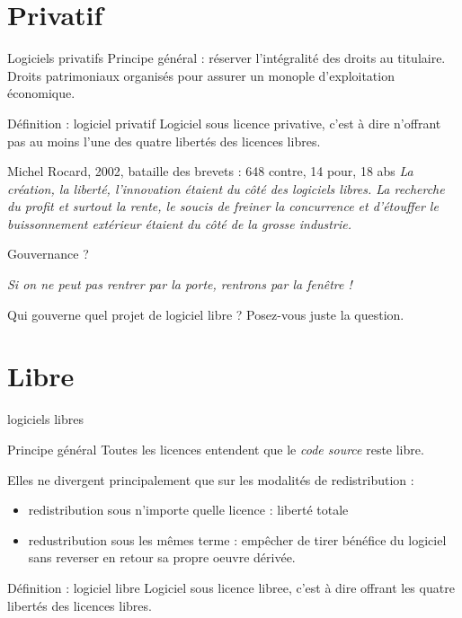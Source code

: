 \documentclass{beamer}
\begin{document}
\section{Privatif}


\begin{frame}{Logiciels privatifs}
  Principe général : réserver l'intégralité des droits au titulaire. Droits patrimoniaux organisés pour assurer un monople d'exploitation économique.

  \begin{alertblock}{Définition : logiciel privatif}
    Logiciel sous licence privative, c'est à dire n'offrant pas au moins l'une des quatre libertés des licences libres.    
  \end{alertblock}

\pause

  \begin{block}{Michel Rocard, 2002, bataille des brevets : 648 contre, 14 pour, 18 abs}
   \textit{ La création, la liberté, l'innovation étaient du côté des logiciels libres. La recherche du profit et surtout la rente, le soucis de freiner la concurrence et d'étouffer le buissonnement extérieur étaient du côté de la grosse industrie.
}
  \end{block}
\end{frame}

\begin{frame}{Gouvernance ?}
  
\textit{Si on ne peut pas rentrer par la porte, rentrons par la fenêtre !}

Qui gouverne quel projet de logiciel libre ? Posez-vous juste la question.

\end{frame}

\section{Libre}


\begin{frame}{logiciels libres}

  \begin{alertblock}{Principe général}
    Toutes les licences entendent que le \textit{code source} reste libre.
  \end{alertblock}
  Elles ne divergent principalement que sur les modalités de redistribution :
  \begin{itemize}
  \item redistribution sous n'importe quelle licence : liberté totale
  \item redustribution sous les mêmes terme : empêcher de tirer bénéfice du logiciel sans reverser en retour sa propre oeuvre dérivée.
  \end{itemize}

  \begin{alertblock}{Définition : logiciel libre}
    Logiciel sous licence libree, c'est à dire offrant les quatre libertés des licences libres.    
  \end{alertblock}
  
\end{frame}
\end{document}
